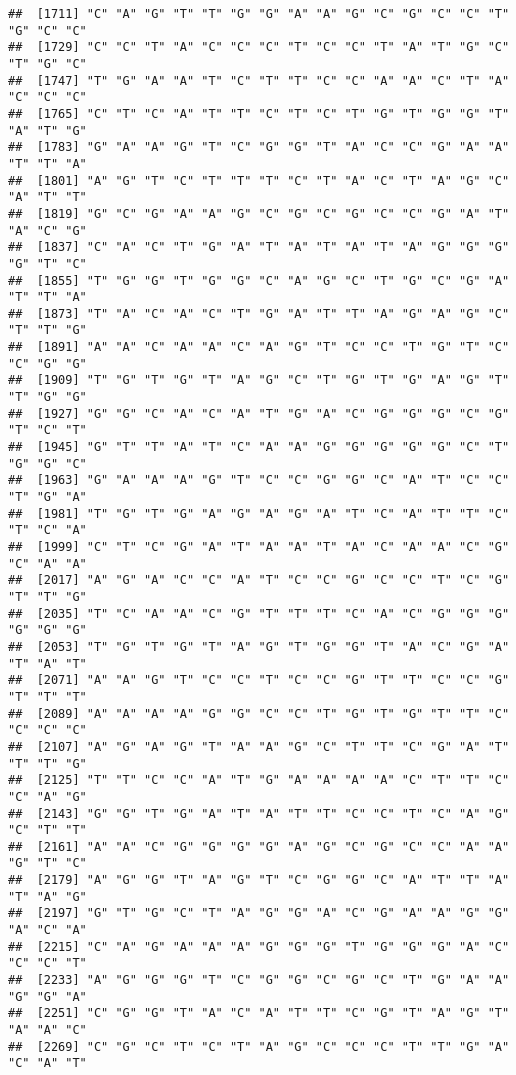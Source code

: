 \documentclass[
]{article}
\begin{document}
\begin{verbatim}
##  [1711] "C" "A" "G" "T" "T" "G" "G" "A" "A" "G" "C" "G" "C" "C" "T" "G" "C" "C"
##  [1729] "C" "C" "T" "A" "C" "C" "C" "T" "C" "C" "T" "A" "T" "G" "C" "T" "G" "C"
##  [1747] "T" "G" "A" "A" "T" "C" "T" "T" "C" "C" "A" "A" "C" "T" "A" "C" "C" "C"
##  [1765] "C" "T" "C" "A" "T" "T" "C" "T" "C" "T" "G" "T" "G" "G" "T" "A" "T" "G"
##  [1783] "G" "A" "A" "G" "T" "C" "G" "G" "T" "A" "C" "C" "G" "A" "A" "T" "T" "A"
##  [1801] "A" "G" "T" "C" "T" "T" "T" "C" "T" "A" "C" "T" "A" "G" "C" "A" "T" "T"
##  [1819] "G" "C" "G" "A" "A" "G" "C" "G" "C" "G" "C" "C" "G" "A" "T" "A" "C" "G"
##  [1837] "C" "A" "C" "T" "G" "A" "T" "A" "T" "A" "T" "A" "G" "G" "G" "G" "T" "C"
##  [1855] "T" "G" "G" "T" "G" "G" "C" "A" "G" "C" "T" "G" "C" "G" "A" "T" "T" "A"
##  [1873] "T" "A" "C" "A" "C" "T" "G" "A" "T" "T" "A" "G" "A" "G" "C" "T" "T" "G"
##  [1891] "A" "A" "C" "A" "A" "C" "A" "G" "T" "C" "C" "T" "G" "T" "C" "C" "G" "G"
##  [1909] "T" "G" "T" "G" "T" "A" "G" "C" "T" "G" "T" "G" "A" "G" "T" "T" "G" "G"
##  [1927] "G" "G" "C" "A" "C" "A" "T" "G" "A" "C" "G" "G" "G" "C" "G" "T" "C" "T"
##  [1945] "G" "T" "T" "A" "T" "C" "A" "A" "G" "G" "G" "G" "G" "C" "T" "G" "G" "C"
##  [1963] "G" "A" "A" "A" "G" "T" "C" "C" "G" "G" "C" "A" "T" "C" "C" "T" "G" "A"
##  [1981] "T" "G" "T" "G" "A" "G" "A" "G" "A" "T" "C" "A" "T" "T" "C" "T" "C" "A"
##  [1999] "C" "T" "C" "G" "A" "T" "A" "A" "T" "A" "C" "A" "A" "C" "G" "C" "A" "A"
##  [2017] "A" "G" "A" "C" "C" "A" "T" "C" "C" "G" "C" "C" "T" "C" "G" "T" "T" "G"
##  [2035] "T" "C" "A" "A" "C" "G" "T" "T" "T" "C" "A" "C" "G" "G" "G" "G" "G" "G"
##  [2053] "T" "G" "T" "G" "T" "A" "G" "T" "G" "G" "T" "A" "C" "G" "A" "T" "A" "T"
##  [2071] "A" "A" "G" "T" "C" "C" "T" "C" "C" "G" "T" "T" "C" "C" "G" "T" "T" "T"
##  [2089] "A" "A" "A" "A" "G" "G" "C" "C" "T" "G" "T" "G" "T" "T" "C" "C" "C" "C"
##  [2107] "A" "G" "A" "G" "T" "A" "A" "G" "C" "T" "T" "C" "G" "A" "T" "T" "T" "G"
##  [2125] "T" "T" "C" "C" "A" "T" "G" "A" "A" "A" "A" "C" "T" "T" "C" "C" "A" "G"
##  [2143] "G" "G" "T" "G" "A" "T" "A" "T" "T" "C" "C" "T" "C" "A" "G" "C" "T" "T"
##  [2161] "A" "A" "C" "G" "G" "G" "G" "A" "G" "C" "G" "C" "C" "A" "A" "G" "T" "C"
##  [2179] "A" "G" "G" "T" "A" "G" "T" "C" "G" "G" "C" "A" "T" "T" "A" "T" "A" "G"
##  [2197] "G" "T" "G" "C" "T" "A" "G" "G" "A" "C" "G" "A" "A" "G" "G" "A" "C" "A"
##  [2215] "C" "A" "G" "A" "A" "A" "G" "G" "G" "T" "G" "G" "G" "A" "C" "C" "C" "T"
##  [2233] "A" "G" "G" "G" "T" "C" "G" "G" "C" "G" "C" "T" "G" "A" "A" "G" "G" "A"
##  [2251] "C" "G" "G" "T" "A" "C" "A" "T" "T" "C" "G" "T" "A" "G" "T" "A" "A" "C"
##  [2269] "C" "G" "C" "T" "C" "T" "A" "G" "C" "C" "C" "T" "T" "G" "A" "C" "A" "T"

\end{verbatim}
\end{document}
